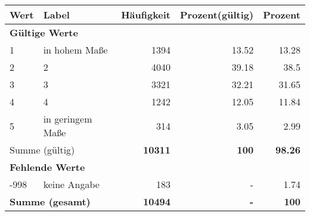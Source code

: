      \begin{longtable}{lXrrr}
     \toprule
     \textbf{Wert} & \textbf{Label} & \textbf{Häufigkeit} & \textbf{Prozent(gültig)} & \textbf{Prozent} \\
     \endhead
     \midrule
     \multicolumn{5}{l}{\textbf{Gültige Werte}}\\

     1 &
     \multicolumn{1}{X}{ in hohem Maße   } &


       \num{1394} &
       \num[round-mode=places,round-precision=2]{13,52} &
         \num[round-mode=places,round-precision=2]{13,28} \\

     2 &
     \multicolumn{1}{X}{ 2   } &


       \num{4040} &
       \num[round-mode=places,round-precision=2]{39,18} &
         \num[round-mode=places,round-precision=2]{38,5} \\

     3 &
     \multicolumn{1}{X}{ 3   } &


       \num{3321} &
       \num[round-mode=places,round-precision=2]{32,21} &
         \num[round-mode=places,round-precision=2]{31,65} \\

     4 &
     \multicolumn{1}{X}{ 4   } &


       \num{1242} &
       \num[round-mode=places,round-precision=2]{12,05} &
         \num[round-mode=places,round-precision=2]{11,84} \\

     5 &
     \multicolumn{1}{X}{ in geringem Maße   } &


       \num{314} &
       \num[round-mode=places,round-precision=2]{3,05} &
         \num[round-mode=places,round-precision=2]{2,99} \\
     \midrule
     \multicolumn{2}{l}{Summe (gültig)} &
       \textbf{\num{10311}} &
     \textbf{100} &
       \textbf{\num[round-mode=places,round-precision=2]{98,26}} \\
     \multicolumn{5}{l}{\textbf{Fehlende Werte}}\\
       -998 &
       keine Angabe &
         \num{183} &
        - &
         \num[round-mode=places,round-precision=2]{1,74} \\
     \midrule
     \multicolumn{2}{l}{\textbf{Summe (gesamt)}} &
          \textbf{\num{10494}} &
        \textbf{-} &
        \textbf{100} \\
     \bottomrule
     \end{longtable}
     
